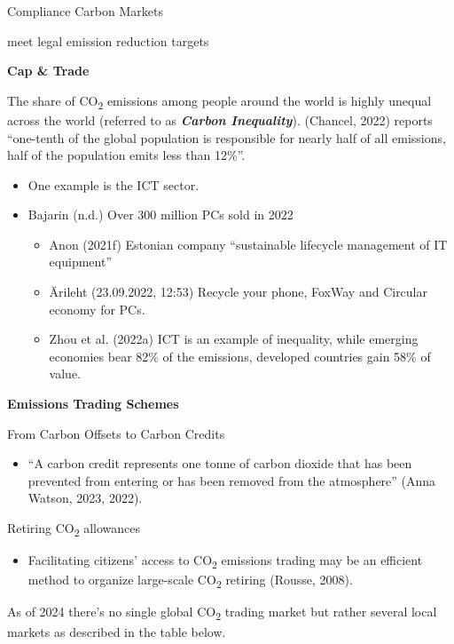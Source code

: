 \documentclass[
  letterpaper,
  DIV=11,
  numbers=noendperiod]{scrartcl}
\providecommand{\tightlist}{%
  \setlength{\itemsep}{0pt}\setlength{\parskip}{0pt}}\usepackage{longtable,booktabs,array}
\begin{document}
Compliance Carbon Markets

meet legal emission reduction targets

\textbf{Cap \& Trade}

The share of CO\textsubscript{2} emissions among people around the world
is highly unequal across the world (referred to as \textbf{\emph{Carbon
Inequality}}). (Chancel, 2022) reports ``one-tenth of the global
population is responsible for nearly half of all emissions, half of the
population emits less than 12\%''.

\begin{itemize}
\item
  One example is the ICT sector.
\item
  Bajarin (n.d.) Over 300 million PCs sold in 2022

  \begin{itemize}
  \tightlist
  \item
    Anon (2021f) Estonian company ``sustainable lifecycle management of
    IT equipment''
  \item
    Ärileht (23.09.2022, 12:53) Recycle your phone, FoxWay and Circular
    economy for PCs.
  \item
    Zhou et al. (2022a) ICT is an example of inequality, while emerging
    economies bear 82\% of the emissions, developed countries gain 58\%
    of value.
  \end{itemize}
\end{itemize}

\textbf{Emissions Trading Schemes}

From Carbon Offsets to Carbon Credits

\begin{itemize}
\tightlist
\item
  ``A carbon credit represents one tonne of carbon dioxide that has been
  prevented from entering or has been removed from the atmosphere''
  (Anna Watson, 2023, 2022).
\end{itemize}

Retiring CO\textsubscript{2} allowances

\begin{itemize}
\tightlist
\item
  Facilitating citizens' access to CO\textsubscript{2} emissions trading
  may be an efficient method to organize large-scale CO\textsubscript{2}
  retiring (Rousse, 2008).
\end{itemize}

As of 2024 there's no single global CO\textsubscript{2} trading market
but rather several local markets as described in the table below.
\end{document}
